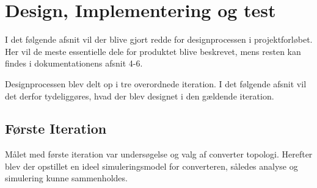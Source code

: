 \chapter{Design, Implementering og test}
I det følgende afsnit vil der blive gjort redde for designprocessen i projektforløbet. Her vil de meste essentielle dele for produktet blive beskrevet, mens resten kan findes i dokumentationens afsnit 4-6.

Designprocessen blev delt op i tre overordnede iteration. I det følgende afsnit vil det derfor tydeliggøres, hvad der blev designet i den gældende iteration. 

\section{Første Iteration}
Målet med første iteration var undersøgelse og valg af converter topologi. Herefter blev der opstillet en ideel simuleringsmodel for converteren, således analyse og simulering kunne sammenholdes. 






	
	
